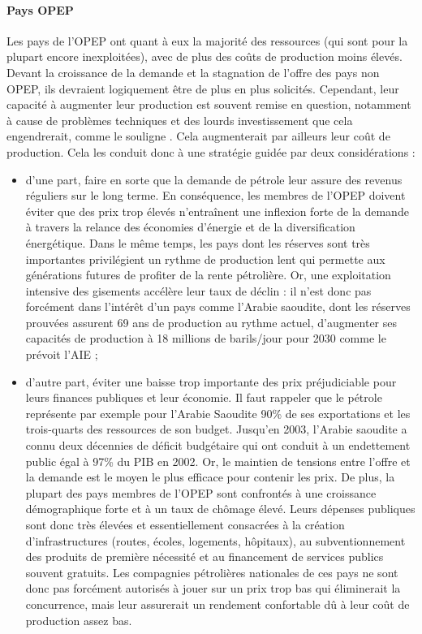 \paragraph{Pays OPEP}
Les pays de l’OPEP ont quant à eux la majorité des ressources (qui sont pour la plupart encore inexploitées), avec de plus des coûts de production moins élevés. Devant la croissance de la demande et la stagnation de l’offre des pays non OPEP, ils devraient logiquement être de plus en plus solicités. Cependant, leur capacité à augmenter leur production est souvent remise en question, notamment à cause de problèmes techniques et des lourds investissement que cela engendrerait, comme le souligne \cite{rapSenat}. Cela augmenterait par ailleurs leur coût de production. Cela les conduit donc à une stratégie guidée par deux considérations :
\begin{itemize}
	\item d’une part, faire en sorte que la demande de pétrole leur assure des revenus réguliers sur le long terme. En conséquence, les membres de l’OPEP doivent éviter que des prix trop élevés n’entraînent une inflexion forte de la demande à travers la relance des économies d’énergie et de la diversification énergétique. Dans le même temps, les pays dont les réserves sont très importantes privilégient un rythme de production lent qui permette aux générations futures de profiter de la rente pétrolière. Or, une exploitation intensive des gisements accélère leur taux de déclin : il n’est donc pas forcément dans l’intérêt d’un pays comme l’Arabie saoudite, dont les réserves prouvées assurent 69 ans de production au rythme actuel, d’augmenter ses capacités de production à 18 millions de barils/jour pour 2030 comme le prévoit l’AIE ;
	\item d’autre part, éviter une baisse trop importante des prix préjudiciable pour leurs finances publiques et leur économie. Il faut rappeler que le pétrole représente par exemple pour l’Arabie Saoudite 90\% de ses exportations et les trois-quarts des ressources de son budget. Jusqu’en 2003, l’Arabie saoudite a connu deux décennies de déficit budgétaire qui ont conduit à un endettement public égal à 97\% du PIB en 2002. Or, le maintien de tensions entre l’offre et la demande est le moyen le plus efficace pour contenir les prix. De plus, la plupart des pays membres de l’OPEP sont confrontés à une croissance démographique forte et à un taux de chômage élevé. Leurs dépenses publiques sont donc très élevées et essentiellement consacrées à la création d’infrastructures (routes, écoles, logements, hôpitaux), au subventionnement des produits de première nécessité et au financement de services publics souvent gratuits. Les compagnies pétrolières nationales de ces pays ne sont donc pas forcément autorisés à jouer sur un prix trop bas qui éliminerait la concurrence, mais leur assurerait un rendement confortable dû à leur coût de production assez bas.
\end{itemize}

